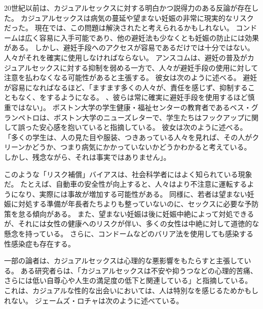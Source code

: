 \documentclass[paper=a4,book,openany]{jlreq}
\begin{document}
20世紀以前は、カジュアルセックスに対する明白かつ説得力のある反論が存在した。
カジュアルセックスは病気の蔓延や望まない妊娠の非常に現実的なリスクだった。
現在では、この問題は解決されたと考えられるかもしれない。
コンドームは広く容易に入手可能であり、他の避妊法も少なくとも妊娠の防止には効果がある。
しかし、避妊手段へのアクセスが容易であるだけでは十分ではない。
人々がそれを確実に使用しなければならない。
アンスコムは、避妊の普及がカジュアルセックスに対する抑制を弱める一方で、人々が避妊手段の使用に対して注意を払わなくなる可能性があると主張する。
彼女は次のように述べる。
避妊が容易になればなるほど、「ますます多くの人々が、責任を感じず、抑制することもなく、をするようになる。
、彼らは常に確実に避妊手段を使用するほど慎重ではない」\citep[p.146]{anscombe72contraception}。
ボストン大学の学生健康・福祉センターの教育者であるベス・グランペトロは、ボストン大学のニューズレターで、学生たちはフックアップに関して誤った安心感を抱いていると指摘している。
彼女は次のように述べる。
「多くの学生は、人の見た目や服装、つきあっている人々を見れば、その人がクリーンかどうか、つまり病気にかかっていないかどうかわかると考えている。
しかし、残念ながら、それは事実ではありません」\citep{noa07:_prob_hook_up}。

このような「リスク補償」バイアスは、社会科学者にはよく知られている現象だ。
たとえば、自動車の安全性が向上すると、人々はより不注意に運転するようになり、実際には事故が増加する可能性がある。
同様に、若者は望まない妊娠に対処する準備が年長者たちよりも整っていないのに、セックスに必要な予防策を怠る傾向がある。
また、望まない妊娠は後に妊娠中絶によって対処できるが、それには女性の健康へのリスクが伴い、多くの女性は中絶に対して道徳的な懸念を持っている。
さらに、コンドームなどのバリア法を使用しても感染する性感染症も存在する。

一部の論者は、カジュアルセックスは心理的な悪影響をもたらすと主張している。
ある研究者らは、「カジュアルセックスは不安や抑うつなどの心理的苦痛、さらには低い自尊心や人生の満足度の低下と関連している」と指摘している\citep{napper16:_asses_pers_negat}。
これは、カジュアルな性的な出会いにおいては、人は特別なを感じるためかもしれない。
ジェームズ・ロチャは次のように述べている。
\end{document}
